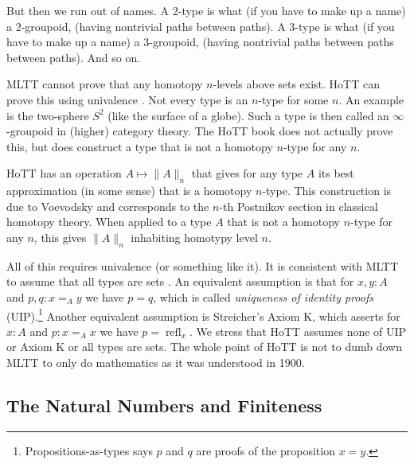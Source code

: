 \documentclass[11pt]{article}
\DeclareMathOperator{\refl}{refl}
\newcommand{\proptrunc}[1]{\lVert #1 \rVert}
\begin{document}
But then we run out of names.  A 2-type is what (if you have to make up
a name) a 2-groupoid, (having nontrivial paths between paths).
A 3-type is what (if you have to make up
a name) a 3-groupoid, (having nontrivial paths between paths between paths).
And so on.

MLTT cannot prove that any homotopy $n$-levels above sets exist.
HoTT can prove this using univalence .
Not every type is an $n$-type for some $n$.
An example is the two-sphere $S^2$ (like the surface of a globe).
Such a type is then called an $\infty$-groupoid in (higher) category theory.
The HoTT book does not actually prove this, but does construct
 a type that is not a homotopy $n$-type
for any $n$.

HoTT has  an operation
$A \mapsto \proptrunc{A}_n$ that gives for any type $A$ its best approximation
(in some sense) that is a homotopy $n$-type.  This construction is due
to Voevodsky and corresponds to the $n$-th Postnikov section in classical
homotopy theory.  When applied to a type $A$ that is not a homotopy $n$-type
for any $n$, this gives $\proptrunc{A}_n$ inhabiting homotypy level $n$.

All of this requires univalence (or something like it).
It is consistent with MLTT to assume that all types are sets
.
An equivalent assumption is that for $x, y : A$ and $p, q : x =_A y$
we have $p = q$, which is called \emph{uniqueness of identity proofs}
(UIP).\footnote{Propositions-as-types says $p$ and $q$ are proofs
of the proposition $x = y$.}
Another equivalent assumption is Streicher’s Axiom K, which asserts
for $x : A$ and $p : x =_A x$ we have $p = \refl_x$.
We stress that HoTT assumes none of UIP or Axiom K or all types are sets.
The whole point of HoTT is not to dumb down MLTT to only do mathematics
as it was understood in 1900.

\subsection{The Natural Numbers and Finiteness}
\end{document}
